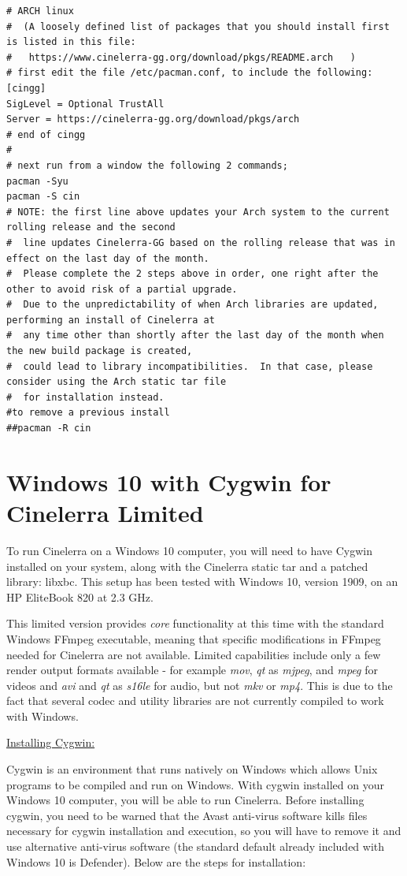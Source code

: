 \begin{lstlisting}[numbers=none]
# ARCH linux
#  (A loosely defined list of packages that you should install first is listed in this file:
#   https://www.cinelerra-gg.org/download/pkgs/README.arch   )
# first edit the file /etc/pacman.conf, to include the following:
[cingg]
SigLevel = Optional TrustAll
Server = https://cinelerra-gg.org/download/pkgs/arch
# end of cingg
#
# next run from a window the following 2 commands;
pacman -Syu
pacman -S cin
# NOTE: the first line above updates your Arch system to the current rolling release and the second
#  line updates Cinelerra-GG based on the rolling release that was in effect on the last day of the month.
#  Please complete the 2 steps above in order, one right after the other to avoid risk of a partial upgrade.
#  Due to the unpredictability of when Arch libraries are updated, performing an install of Cinelerra at
#  any time other than shortly after the last day of the month when the new build package is created,
#  could lead to library incompatibilities.  In that case, please consider using the Arch static tar file
#  for installation instead.
#to remove a previous install
##pacman -R cin
\end{lstlisting}

\section{Windows 10 with Cygwin for Cinelerra Limited}%
\label{sec:ms_windows10}

To run Cinelerra on a Windows 10 computer, you will need to have Cygwin installed on your system, 
along with the  Cinelerra static tar and a patched library: libxbc.  This setup has been tested 
with Windows 10, version 1909, on an HP EliteBook 820 at 2.3 GHz.

This limited version provides \textit{core} functionality at this time with the standard Windows FFmpeg
executable, meaning that specific modifications in FFmpeg needed for Cinelerra are not available. 
Limited capabilities include only a few render output formats available - for example \textit{mov}, \textit{qt} 
as \textit{mjpeg}, and \textit{mpeg} for videos and \textit{avi} and \textit{qt} as \textit{s16le} 
for audio, but not \textit{mkv} or \textit{mp4}.  
This is due to the fact that several codec and utility libraries are not currently compiled to 
work with Windows.

\underline{Installing Cygwin:}

Cygwin is an environment that runs natively on Windows which allows Unix programs to be compiled 
and run on Windows.  With cygwin installed on your Windows 10 computer, you will be able to run 
Cinelerra.  Before installing cygwin, you need to be warned that the Avast anti-virus software 
kills files necessary for cygwin installation and execution, so you will have to remove it and 
use alternative anti-virus software (the standard default already included with Windows 10 
is Defender). Below are the steps for installation:

